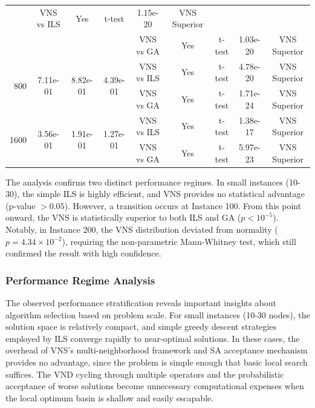 \documentclass[preprint,12pt,authoryear]{elsarticle}
\begin{document}
\begin{table}[ht]
{\begin{tabular}{rcccccccc}
            & VNS vs ILS & Yes & t-test & 1.15e-20 & VNS Superior \\
            & & & & VNS vs GA & Yes & t-test & 1.03e-20 & VNS Superior \\
            \midrule
            \multirow{2}{*}{800} & \multirow{2}{*}{7.11e-01} & \multirow{2}{*}{8.82e-01} & \multirow{2}{*}{4.39e-01} 
            & VNS vs ILS & Yes & t-test & 4.78e-20 & VNS Superior \\
            & & & & VNS vs GA & Yes & t-test & 1.71e-24 & VNS Superior \\
            \midrule
            \multirow{2}{*}{1600} & \multirow{2}{*}{3.56e-01} & \multirow{2}{*}{1.91e-01} & \multirow{2}{*}{1.27e-01} 
            & VNS vs ILS & Yes & t-test & 1.38e-17 & VNS Superior \\
            & & & & VNS vs GA & Yes & t-test & 5.97e-23 & VNS Superior \\
            \bottomrule
        \end{tabular}
    }
\end{table}

The analysis confirms two distinct performance regimes. In small instances (10-30), the simple ILS is highly efficient, and VNS provides no statistical advantage (p-value $> 0.05$). 
However, a transition occurs at Instance 100. From this point onward, the VNS is statistically superior to both ILS and GA ($p < 10^{-5}$). Notably, in Instance 200, 
the VNS distribution deviated from normality ($p=4.34 \times 10^{-2}$), requiring the non-parametric Mann-Whitney test, which still confirmed the result with high confidence.

\subsubsection{Performance Regime Analysis}
The observed performance stratification reveals important insights about algorithm selection based on problem scale. For small instances (10-30 nodes), the solution space 
is relatively compact, and simple greedy descent strategies employed by ILS converge rapidly to near-optimal solutions. In these cases, the overhead of VNS's multi-neighborhood 
framework and SA acceptance mechanism provides no advantage, since the problem is simple enough that basic local search suffices. The VND cycling through multiple operators and the 
probabilistic acceptance of worse solutions become unnecessary computational expenses when the local optimum basin is shallow and easily escapable.
\end{document}
